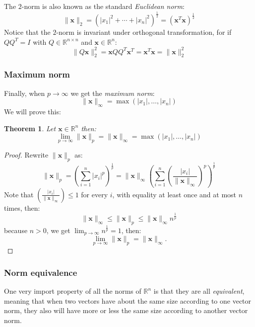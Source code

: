 \documentclass[a4paper,11pt]{report}
\newtheorem{theorem}{Theorem}[section]
\newcommand{\R}{{\mathbb R}}
\begin{document}
The $2$-norm is also known as the standard \emph{Euclidean norm}:
$$\|\mathbf{x}\|_2 = (|x_1|^2+  \cdots + |x_n|^2)^{\frac{1}{2}} = (\mathbf{x}^T \mathbf{x})^{\frac{1}{2}}$$
Notice that the $2$-norm is invariant under orthogonal transformation, for if 
$QQ^T = I$ with $Q \in \R^{n\times n}$ and $\mathbf{x} \in \R^n$:
$$\|Q\mathbf{x}\|^2_2 = \mathbf{x}QQ^T\mathbf{x}^T = \mathbf{x}^T\mathbf{x} = 
\|\mathbf{x}\|^2_2$$

\subsubsection{Maximum norm}
Finally, when $p \to \infty$ we get the \emph{maximum norm}:
$$\|\mathbf{x}\|_\infty = \max(|x_1|, \ldots, |x_n|)$$ 
We will prove this:
\begin{theorem}
  Let $\mathbf{x} \in \R^n$ then:
  $$\lim_{p\to \infty}\|\mathbf{x}\|_p = \|\mathbf{x}\|_\infty =\max(|x_1|, \ldots, |x_n|)$$
\end{theorem}
\begin{proof}
  Rewrite $\|\mathbf{x}\|_p$ as: 
  $$\|\mathbf{x}\|_p = \left(\sum^n_{i=1} |x_i|^p \right)^{\frac{1}{p}} = \|\mathbf{x}\|_\infty 
  \left(\sum^n_{i=1} \left(\frac{|x_i|}{\|\mathbf{x}\|_\infty} \right)^p \right)^{\frac{1}{p}}$$
  Note that $\left(\frac{|x_i|}{\|\mathbf{x}\|_\infty}\right) \leq 1$ for every $i$, with equality at least once and
  at most $n$ times, then:
  $$\|\mathbf{x}\|_\infty \leq \|\mathbf{x}\|_p \leq \|\mathbf{x}\|_\infty n^{\frac{1}{p}}$$ 
  because $n > 0$, we get $\lim_{p\to \infty} n^{\frac{1}{p}} = 1$, then:
  $$\lim_{p\to\infty} \|\mathbf{x}\|_p = \|\mathbf{x}\|_\infty.$$
\end{proof}

\subsubsection{Norm equivalence}

One very import property of all the norms of $\R^n$ is that they are all 
\emph{equivalent}, meaning that when two vectors have about the same size according to one vector norm, they also
will have more or less the same size according to another vector norm. 
\end{document}
